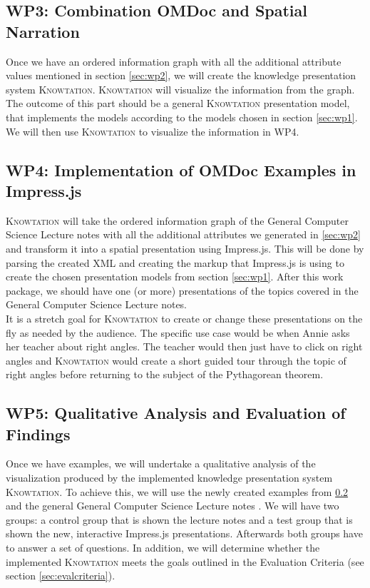 \documentclass[twoside]{article}
\newcommand{\sys}{\textsc{Knowtation}\xspace}
\begin{document}
\subsection{WP3: Combination OMDoc and Spatial Narration}
\label{sec:wp3}

Once we have an ordered information graph with all the additional attribute values mentioned in section \ref{sec:wp2}, we will create the knowledge presentation system \sys. \sys will visualize the information from the graph. The outcome of this part should be a general \sys presentation model, that implements the models according to the models chosen in section \ref{sec:wp1}. We will then use \sys to visualize the information in WP4.\\

\subsection{WP4: Implementation of OMDoc Examples in Impress.js}
\label{sec:wp4}

\sys will take the ordered information graph of the General Computer Science Lecture notes \cite{Kohlhase:GenCSI:base} with all the additional attributes we generated in \ref{sec:wp2} and transform it into a spatial presentation using Impress.js. This will be done by parsing the created XML and creating the markup that Impress.js is using to create the chosen presentation models from section \ref{sec:wp1}. After this work package, we should have one (or more) presentations of the topics covered in the General Computer Science Lecture notes.\\

It is a stretch goal for \sys to create or change these presentations on the fly as needed by the audience. The specific use case would be when Annie asks her teacher about right angles. The teacher would then just have to click on right angles and \sys would create a short guided tour through the topic of right angles before returning to the subject of the Pythagorean theorem.\\

\subsection{WP5: Qualitative Analysis and Evaluation of Findings}
\label{sec:wp5}

Once we have examples, we will undertake a qualitative analysis of the visualization produced by the implemented knowledge presentation system \sys . To achieve this, we will use the newly created examples from \ref{sec:wp4} and the general General Computer Science Lecture notes \cite{Kohlhase:GenCSI:base}. We will have two groups: a control group that is shown the lecture notes and a test group that is shown the new, interactive Impress.js presentations. Afterwards both groups have to answer a set of questions. In addition, we will determine whether the implemented \sys meets the goals outlined in the Evaluation Criteria (see section \ref{sec:evalcriteria}).\\
\end{document}
